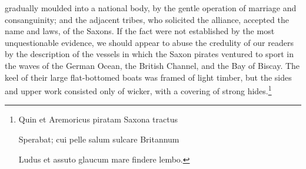 gradually moulded into a national body, by the gentle operation of marriage and consanguinity; and the adjacent tribes, who solicited the alliance, accepted the name and laws, of the Saxons. If the fact were not established by the most unquestionable evidence, we should appear to abuse the credulity of our readers by the description of the vessels in which the Saxon pirates ventured to sport in the waves of the German Ocean, the British Channel, and the Bay of Biscay. The keel of their large flat-bottomed boats was framed of light timber, but the sides and upper work consisted only of wicker, with a covering of strong hides.\footnote{Quin et Aremoricus piratam Saxona tractus

Sperabat; cui pelle salum sulcare Britannum

Ludus et assuto glaucum mare findere lembo.

}
